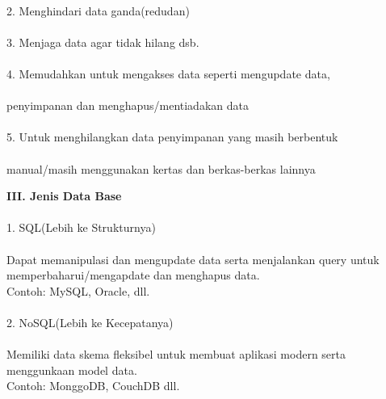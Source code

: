 \documentclass[a4paper,12pt]{article}
\begin{document}
		\paragraph{}
			2.	Menghindari data ganda(redudan)\\
\vspace{-1cm}
		\paragraph{}
			3.	Menjaga data agar tidak hilang dsb.\\
\vspace{-1cm}
		\paragraph{}
			4.	Memudahkan untuk mengakses data  seperti mengupdate data, 
		\paragraph{}
\vspace{-0.6cm}
				penyimpanan dan menghapus/mentiadakan data\\
		\paragraph{}
\vspace{-1cm}
			5.	Untuk menghilangkan data penyimpanan yang masih berbentuk
		\paragraph{}
\vspace{-0.6cm}
				manual/masih menggunakan kertas dan berkas-berkas lainnya 

	\vspace{0.8cm}
		\textbf{III. Jenis Data Base}
		\paragraph{}
			1.	SQL(Lebih ke Strukturnya)
	\paragraph{}
\vspace{-0.3cm}
		Dapat memanipulasi dan mengupdate data serta menjalankan query untuk memperbaharui/mengapdate dan menghapus 			data.\\
		Contoh: MySQL, Oracle, dll.
	\paragraph{}
			2.	NoSQL(Lebih ke Kecepatanya)
	\paragraph{}
\vspace{-0.3cm}
		Memiliki data skema fleksibel untuk membuat aplikasi modern serta menggunkaan model data.\\
		Contoh: MonggoDB, CouchDB dll. 

	
\end{document}
